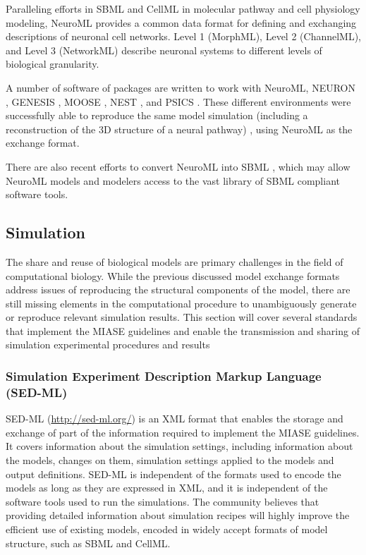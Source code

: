 Paralleling efforts in SBML and CellML in molecular pathway and cell
physiology modeling, NeuroML \autocite{goddard:2001} provides a common
data format for defining and exchanging descriptions of neuronal cell
networks. Level 1 (MorphML), Level 2 (ChannelML), and Level 3
(NetworkML) describe neuronal systems to different levels of biological
granularity.

A number of software of packages are written to work with NeuroML,
NEURON \autocite{carnevale2006neuron}, GENESIS \autocite{bower1995book},
MOOSE \autocite{ray2008pymoose}, NEST \autocite{diesmann2001nest}, and
PSICS \autocite{cannon2010stochastic}. These different environments were
successfully able to reproduce the same model simulation (including a
reconstruction of the 3D structure of a neural pathway)
\autocite{gleeson2010}, using NeuroML as the exchange format.

There are also recent efforts to convert NeuroML into SBML
\autocite{keating2012encoding}, which may allow NeuroML models and
modelers access to the vast library of SBML compliant software tools.

\subsection{Simulation}

The share and reuse of biological models are primary challenges in the
field of computational biology. While the previous discussed model
exchange formats address issues of reproducing the structural components
of the model, there are still missing elements in the computational
procedure to unambiguously generate or reproduce relevant simulation
results. This section will cover several standards that implement the
MIASE guidelines and enable the transmission and sharing of simulation
experimental procedures and results

\subsubsection{Simulation Experiment Description Markup Language
(SED-ML)}

SED-ML (\url{http://sed-ml.org/}) \autocite{kohn2008sed} is an XML
format that enables the storage and exchange of part of the information
required to implement the MIASE guidelines. It covers information about
the simulation settings, including information about the models, changes
on them, simulation settings applied to the models and output
definitions. SED-ML is independent of the formats used to encode the
models as long as they are expressed in XML, and it is independent of
the software tools used to run the simulations. The community believes
that providing detailed information about simulation recipes will highly
improve the efficient use of existing models, encoded in widely accept
formats of model structure, such as SBML and CellML.

